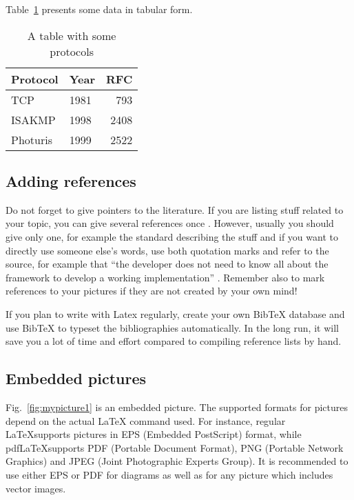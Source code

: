 \documentclass{cseminar}
\begin{document}
Table~\ref{tab:mytable1} presents some data in tabular form. 

\begin{table}[t]
  \begin{center}
    \begin{tabular}{|l|lr|}
    \hline
    Protocol & Year &  RFC \\
    \hline
    TCP      & 1981 &  793 \\
    ISAKMP   & 1998 & 2408 \\
    Photuris & 1999 & 2522 \\
    \hline
    \end{tabular}
    \caption{A table with some protocols}
    \label{tab:mytable1}
  \end{center}
\end{table}




\subsection{Adding references}
\label{sec:references}

Do not forget to give pointers to the literature. If you are listing
stuff related to your topic, you can give several references once
\cite{Com00,HTS03,Nik99}. However, usually you should give only one, for example the standard describing the stuff \cite{RFC2408} and if you want to directly use someone else's words, use both quotation marks and refer to the source, for example that ``the developer does not need to know all about the framework to develop a working implementation'' \cite{Suo98}. Remember also to mark references to your pictures if they are not created by your own mind!

If you plan to write with Latex regularly, create your own BibTeX
database and use BibTeX to typeset the bibliographies automatically.
In the long run, it will save you a lot of time and effort compared to
compiling reference lists by hand.




\subsection{Embedded pictures}
\label{sec:pictures}

Fig.~\ref{fig:mypicture1} is an embedded picture. The supported formats for pictures
depend on the actual LaTeX command used. For instance, regular \LaTeX supports
pictures in EPS (Embedded PostScript) format, while pdf\LaTeX supports PDF (Portable
Document Format), PNG (Portable Network Graphics) and JPEG (Joint Photographic Experts
Group). It is recommended to use either EPS or PDF for diagrams as well as for any picture
which includes vector images.
\end{document}
